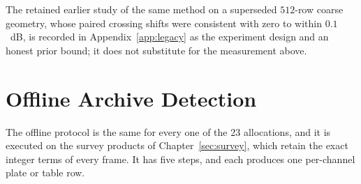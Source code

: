 The retained earlier study of the same method on a superseded $512$-row coarse geometry, whose paired crossing shifts were consistent with zero to within $0.1$~dB, is recorded in Appendix~\ref{app:legacy} as the experiment design and an honest prior bound; it does not substitute for the measurement above.

\section{Offline Archive Detection}
\label{sec:detection:archive}
\label{sec:pipeline:example}

The offline protocol is the same for every one of the 23 allocations, and it is executed on the survey products of Chapter~\ref{sec:survey}, which retain the exact integer terms of every frame. It has five steps, and each produces one per-channel plate or table row.

